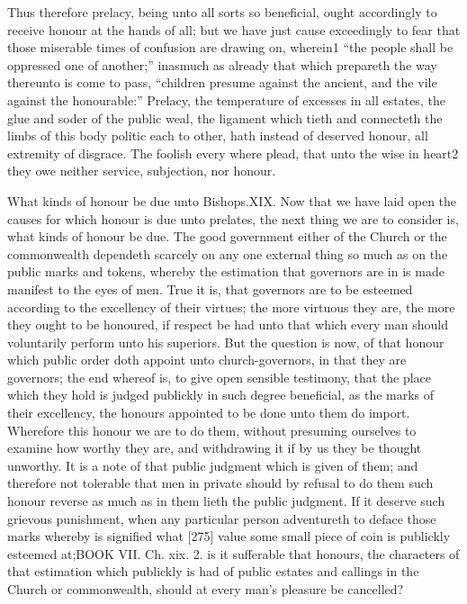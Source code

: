 Thus therefore prelacy, being unto all sorts so beneficial, ought accordingly to receive honour at the hands of all; but we have just cause exceedingly to fear that those miserable times of confusion are drawing on, wherein1 “the people shall be oppressed one of another;” inasmuch as already that which prepareth the way thereunto is come to pass, “children presume against the ancient, and the vile against the honourable:” Prelacy, the temperature of excesses in all estates, the glue and soder of the public weal, the ligament which tieth and connecteth the limbs of this body politic each to other, hath instead of deserved honour, all extremity of disgrace. The foolish every where plead, that unto the wise in heart2 they owe neither service, subjection, nor honour.

What kinds of honour be due unto Bishops.XIX. Now that we have laid open the causes for which honour is due unto prelates, the next thing we are to consider is, what kinds of honour be due. The good government either of the Church or the commonwealth dependeth scarcely on any one external thing so much as on the public marks and tokens, whereby the estimation that governors are in is made manifest to the eyes of men. True it is, that governors are to be esteemed according to the excellency of their virtues; the more virtuous they are, the more they ought to be honoured, if respect be had unto that which every man should voluntarily perform unto his superiors. But the question is now, of that honour which public order doth appoint unto church-governors, in that they are governors; the end whereof is, to give open sensible testimony, that the place which they hold is judged publickly in such degree beneficial, as the marks of their excellency, the honours appointed to be done unto them do import. Wherefore this honour we are to do them, without presuming ourselves to examine how worthy they are, and withdrawing it if by us they be thought unworthy. It is a note of that public judgment which is given of them; and therefore not tolerable that men in private should by refusal to do them such honour reverse as much as in them lieth the public judgment. If it deserve such grievous punishment, when any particular person adventureth to deface those marks whereby is signified what [275] value some small piece of coin is publickly esteemed at;BOOK VII. Ch. xix. 2. is it sufferable that honours, the characters of that estimation which publickly is had of public estates and callings in the Church or commonwealth, should at every man’s pleasure be cancelled?


